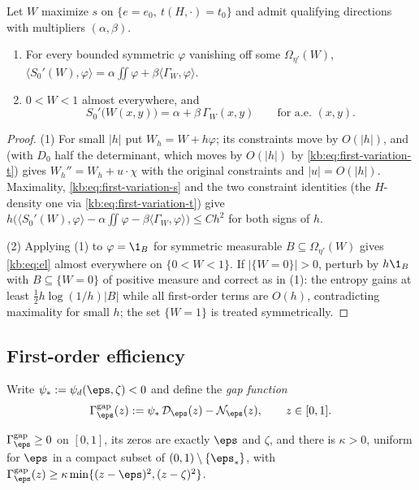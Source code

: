\begin{lemma}\label{kb:lem:el}
Let $W$ maximize $s$ on $\{e=e_0,\ t(H,\cdot)=t_0\}$ and admit qualifying directions with
multipliers $(\alpha,\beta)$.
\begin{enumerate}
\item For every bounded symmetric $\varphi$ vanishing off some $\Omega_{\eta'}(W)$,
  $\langle S_0'(W),\varphi\rangle=\alpha\iint\varphi+\beta\langle\Gamma_W,\varphi\rangle$.
\item $0<W<1$ almost everywhere, and
  \begin{equation}\label{kb:eq:el}
    S_0'\bigl(W(x,y)\bigr)=\alpha+\beta\,\Gamma_W(x,y)\qquad\text{for a.e. }(x,y).
  \end{equation}
\end{enumerate}
\end{lemma}

\begin{proof}
(1) For small $|h|$ put $W_h=W+h\varphi$; its constraints move by $O(|h|)$, and
 (with $D_0$ half the determinant, which moves by $O(|h|)$ by
\eqref{kb:eq:first-variation-t}) gives $W_h''=W_h+u\cdot\chi$ with the original constraints and
$|u|=O(|h|)$.  Maximality, \eqref{kb:eq:first-variation-s} and the two constraint identities
(the $H$-density one via \eqref{kb:eq:first-variation-t}) give
$h\bigl(\langle S_0'(W),\varphi\rangle-\alpha\iint\varphi-\beta\langle\Gamma_W,\varphi\rangle\bigr)
\le Ch^2$ for both signs of $h$.

(2) Applying (1) to $\varphi=\1_{B}$ for symmetric measurable $B\subseteq\Omega_{\eta'}(W)$
gives \eqref{kb:eq:el} almost everywhere on $\{0<W<1\}$.  If $|\{W=0\}|>0$, perturb by
$h\1_{B}$ with $B\subseteq\{W=0\}$ of positive measure and correct as in (1): the entropy
gains at least $\frac12h\log(1/h)|B|$ while all first-order terms are $O(h)$, contradicting
maximality for small $h$; the set $\{W=1\}$ is treated symmetrically.
\end{proof}

\subsection{First-order efficiency}
\label{kb:sec:efficiency}

Write $\psi_*:=\psi_d(\eps,\zeta)<0$ and define the \emph{gap function}
\[
  \Gamma^{\mathrm{gap}}_\eps(z):=\psi_*\,\mathcal D_\eps(z)-\mathcal N_\eps(z),
  \qquad z\in[0,1].
\]

\begin{lemma}\label{kb:lem:gap}
$\Gamma^{\mathrm{gap}}_\eps\ge0$ on $[0,1]$, its zeros are exactly $\eps$ and
$\zeta$, and there is $\kappa>0$, uniform for $\eps$ in a compact subset of
$(0,1)\setminus\{\eps_*\}$, with
$\Gamma^{\mathrm{gap}}_\eps(z)\ge\kappa\min\{(z-\eps)^2,(z-\zeta)^2\}$.
\end{lemma}

